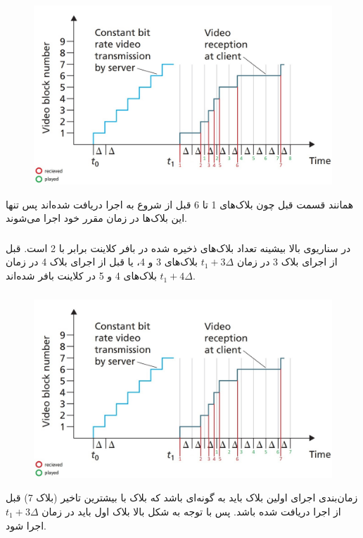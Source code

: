 \documentclass{article}
\begin{document}
\subsubsection{}
\begin{figure}[H]
    \centering
    \includegraphics[width=1.0\textwidth]{figures/1b.jpg}
    \caption
	{}
    \label{fig:fig1}
\end{figure}
همانند قسمت قبل چون بلاک‌های 1 تا 6 قبل از شروع به اجرا دریافت شده‌اند پس تنها این بلاک‌ها در زمان مقرر خود اجرا می‌شوند.
\subsubsection{}
در سناریوی بالا بیشینه تعداد بلاک‌های ذخیره شده در بافر کلاینت برابر با 2 است. قبل از اجرای بلاک 3 در زمان $t_{1} + 3\Delta$ بلاک‌های 3 و 4، یا قبل از اجرای بلاک 4 در زمان $t_{1} + 4\Delta$ بلاک‌های 4 و 5 در کلاینت بافر شده‌اند.
\subsubsection{}
\begin{figure}[H]
    \centering
    \includegraphics[width=1.0\textwidth]{figures/1d.jpg}
    \caption
	{}
    \label{fig:fig1}
\end{figure}
زمان‌بندی اجرای اولین بلاک باید به گونه‌ای باشد که بلاک با بیشترین تاخیر (بلاک 7) قبل از اجرا دریافت شده باشد. پس با توجه به شکل بالا بلاک اول باید در زمان $t_{1} + 3\Delta$ اجرا شود.
\end{document}
